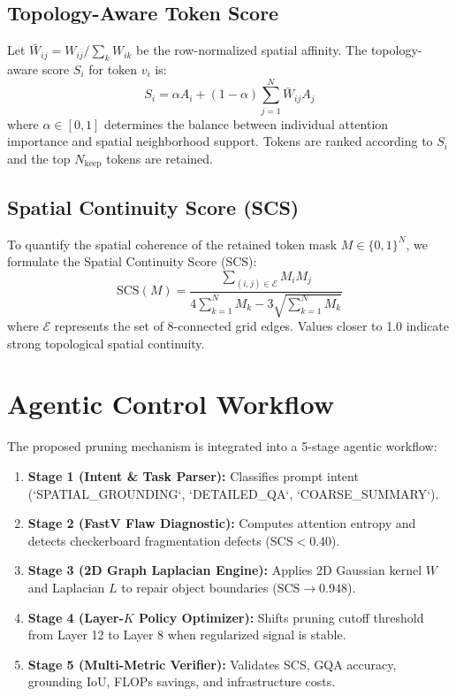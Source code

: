 \documentclass[conference]{IEEEtran}
\begin{document}
\subsection{Topology-Aware Token Score}
Let $\bar{W}_{ij} = W_{ij} / \sum_{k} W_{ik}$ be the row-normalized spatial affinity. The topology-aware score $S_i$ for token $v_i$ is:
\begin{equation}
S_i = \alpha A_i + (1 - \alpha) \sum_{j=1}^N \bar{W}_{ij} A_j
\end{equation}
where $\alpha \in [0, 1]$ determines the balance between individual attention importance and spatial neighborhood support. Tokens are ranked according to $S_i$ and the top $N_{\text{keep}}$ tokens are retained.

\subsection{Spatial Continuity Score (SCS)}
To quantify the spatial coherence of the retained token mask $M \in \{0, 1\}^N$, we formulate the Spatial Continuity Score (SCS):
\begin{equation}
\text{SCS}(M) = \frac{\sum_{(i,j) \in \mathcal{E}} M_i M_j}{4 \sum_{k=1}^N M_k - 3\sqrt{\sum_{k=1}^N M_k}}
\end{equation}
where $\mathcal{E}$ represents the set of 8-connected grid edges. Values closer to 1.0 indicate strong topological spatial continuity.

\section{Agentic Control Workflow}
The proposed pruning mechanism is integrated into a 5-stage agentic workflow:
\begin{enumerate}
    \item \textbf{Stage 1 (Intent \& Task Parser):} Classifies prompt intent (`SPATIAL\_GROUNDING`, `DETAILED\_QA`, `COARSE\_SUMMARY`).
    \item \textbf{Stage 2 (FastV Flaw Diagnostic):} Computes attention entropy and detects checkerboard fragmentation defects ($\text{SCS} < 0.40$).
    \item \textbf{Stage 3 (2D Graph Laplacian Engine):} Applies 2D Gaussian kernel $W$ and Laplacian $L$ to repair object boundaries ($\text{SCS} \to 0.948$).
    \item \textbf{Stage 4 (Layer-$K$ Policy Optimizer):} Shifts pruning cutoff threshold from Layer 12 to Layer 8 when regularized signal is stable.
    \item \textbf{Stage 5 (Multi-Metric Verifier):} Validates SCS, GQA accuracy, grounding IoU, FLOPs savings, and infrastructure costs.
\end{enumerate}
\end{document}
